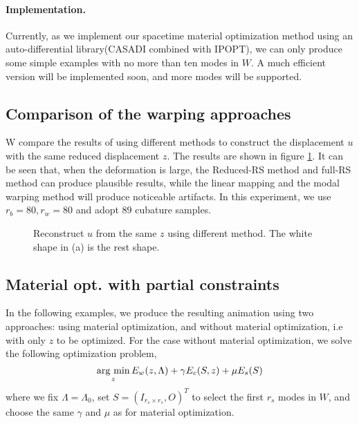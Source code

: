 \documentclass[9pt,twocolumn]{extarticle}
\newcommand{\argmin}{\operatornamewithlimits{arg\ min}}
\begin{document}
\paragraph{Implementation. } Currently, as we implement our spacetime material
optimization method using an auto-differential library(CASADI combined with
IPOPT), we can only produce some simple examples with no more than ten modes in
$W$. A much efficient version will be implemented soon, and more modes will be
supported.

\subsection{Comparison of the warping approaches}
W compare the results of using different methods to construct the displacement
$u$ with the same reduced displacement $z$. The results are shown in figure
\ref{rs_compare}. It can be seen that, when the deformation is large, the
Reduced-RS method and full-RS method can produce plausible results, while the
linear mapping and the modal warping method will produce noticeable
artifacts. In this experiment, we use $r_b=80,r_w=80$ and adopt $89$ cubature
samples.

\begin{figure}
  \centering {}
  \caption{Reconstruct $u$ from the same $z$ using different method. The white
    shape in (a) is the rest shape.}
  \label{rs_compare}
\end{figure}

\subsection{Material opt. with partial constraints}
In the following examples, we produce the resulting animation using two
approaches: using material optimization, and without material optimization, i.e
with only $z$ to be optimized. For the case without material optimization, we
solve the following optimization problem,
\begin{equation} \label{opt_z}
  \argmin_{z} E_w(z,\Lambda)+\gamma E_c(S,z)+\mu E_s(S)
\end{equation}
where we fix $\Lambda=\Lambda_0$, set $S=(I_{r_s\times r_s},O)^T$ to select the
first $r_s$ modes in $W$, and choose the same $\gamma$ and $\mu$ as for material
optimization.
\end{document}
